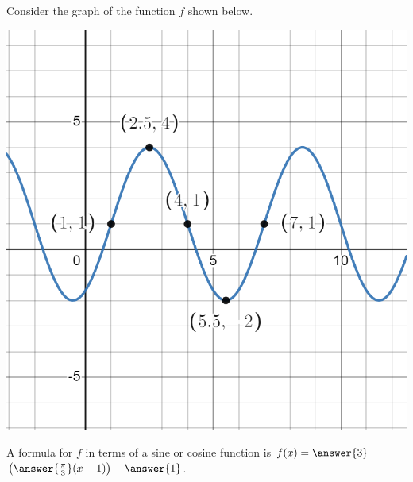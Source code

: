 \documentclass{ximera}
\begin{document}
\begin{exercise}
Consider the graph of the function $f$ shown below. 

\begin{image}
\includegraphics[width=0.8\linewidth]{TF9-graph-3.png}
\end{image}

A formula for $f$ in terms of a sine or cosine function is $f(x) = \answer{3}$\wordChoice{\choice[correct]{$\sin$}\choice{$\cos$}}$\left(\answer{\frac{\pi}{3}}(x - 1)\right) + \answer{1}$. 
\end{exercise} 
\end{document}
